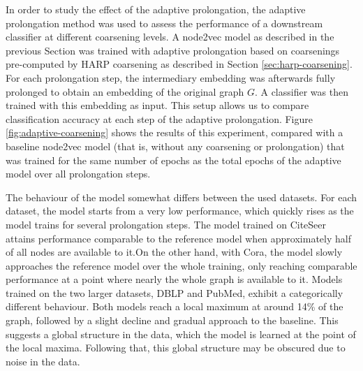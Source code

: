 In order to study the effect of the adaptive prolongation, the adaptive prolongation method was used to assess the performance of a downstream classifier at different coarsening levels. A node2vec model as described in the previous Section was trained with adaptive prolongation based on coarsenings pre-computed by HARP coarsening as described in Section \ref{sec:harp-coarsening}. For each prolongation step, the intermediary embedding was afterwards fully prolonged to obtain an embedding of the original graph \( G \). A classifier was then trained with this embedding as input. This setup allows us to compare classification accuracy at each step of the adaptive prolongation. Figure \ref{fig:adaptive-coarsening} shows the results of this experiment, compared with a baseline node2vec model (that is, without any coarsening or prolongation) that was trained for the same number of epochs as the total epochs of the adaptive model over all prolongation steps.

The behaviour of the model somewhat differs between the used datasets. For each dataset, the model starts from a very low performance, which quickly rises as the model trains for several prolongation steps. The model trained on CiteSeer attains performance comparable to the reference model when approximately half of all nodes are available to it.On the other hand, with Cora, the model slowly approaches the reference model over the whole training, only reaching comparable performance at a point where nearly the whole graph is available to it. Models trained on the two larger datasets, DBLP and PubMed, exhibit a categorically different behaviour. Both models reach a local maximum at around 14\% of the graph, followed by a slight decline and gradual approach to the baseline. This suggests a global structure in the data, which the model is learned at the point of the local maxima. Following that, this global structure may be obscured due to noise in the data.



